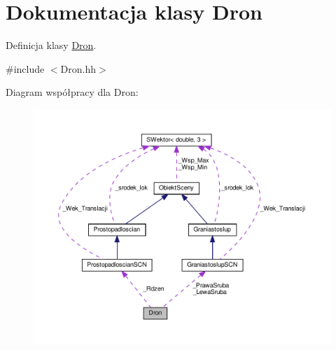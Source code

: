 \hypertarget{classDron}{}\section{Dokumentacja klasy Dron}
\label{classDron}


Definicja klasy \hyperlink{classDron}{Dron}.  




{\ttfamily \#include $<$Dron.\+hh$>$}



Diagram współpracy dla Dron\+:
\nopagebreak
\begin{figure}[H]
\begin{center}
\leavevmode
\includegraphics[width=350pt]{classDron__coll__graph}
\end{center}
\end{figure}

